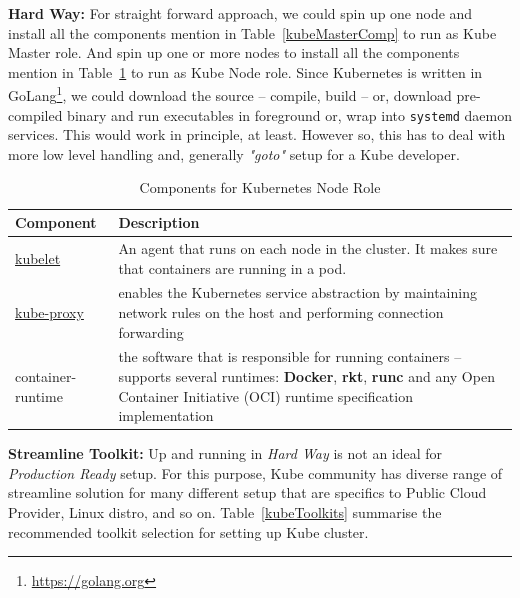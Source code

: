 \noindent \textbf{Hard Way:} \quad For straight forward approach, we could spin up one node and install all the components mention in Table~\ref{kubeMasterComp} to run as Kube Master role. And spin up one or more nodes to install all the components mention in Table~\ref{kubeNodeComp} to run as Kube Node role. Since Kubernetes is written in GoLang\footnote{\url{https://golang.org}}, we could download the source -- compile, build -- or, download pre-compiled binary and run executables in foreground or, wrap into \verb|systemd| daemon services. This would work in principle, at least. However so, this has to deal with more low level handling and, generally \emph{"goto"} setup for a Kube developer.

\begin{table}[H]
\centering
    \begin{tabular}{ | l | p{11cm} |}
    \hline
    Component & Description \\ \hline
    \href{https://kubernetes.io/docs/reference/command-line-tools-reference/kubelet/}{kubelet} & An agent that runs on each node in the cluster. It makes sure that containers are running in a pod. \\ \hline
    \href{https://kubernetes.io/docs/reference/command-line-tools-reference/kube-proxy/}{kube-proxy} & enables the Kubernetes service abstraction by maintaining network rules on the host and performing connection forwarding \\  \hline
    container-runtime & the software that is responsible for running containers -- supports several runtimes: \textbf{Docker}, \textbf{rkt}, \textbf{runc} and any Open Container Initiative (OCI) runtime specification implementation \\
    \hline
    \end{tabular}
\caption{Components for Kubernetes Node Role}
\label{kubeNodeComp}  
\end{table}

\noindent \textbf{Streamline Toolkit:} \quad Up and running in \emph{Hard Way} is not an ideal for \emph{Production Ready} setup. For this purpose, Kube community has diverse range of streamline solution for many different setup that are specifics to Public Cloud Provider, Linux distro, and so on. Table~\ref{kubeToolkits} summarise the recommended toolkit selection for setting up Kube cluster. 

